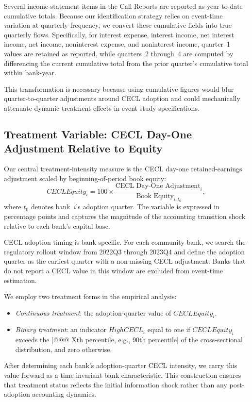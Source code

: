 Several income-statement items in the Call Reports are reported as year-to-date cumulative totals. Because our identification strategy relies on event-time variation at quarterly frequency, we convert these cumulative fields into true quarterly flows. Specifically, for interest expense, interest income, net interest income, net income, noninterest expense, and noninterest income, quarter~1 values are retained as reported, while quarters~2 through~4 are computed by differencing the current cumulative total from the prior quarter's cumulative total within bank-year.

This transformation is necessary because using cumulative figures would blur quarter-to-quarter adjustments around CECL adoption and could mechanically attenuate dynamic treatment effects in event-study specifications.

\subsection{Treatment Variable: CECL Day-One Adjustment Relative to Equity}

Our central treatment-intensity measure is the CECL day-one retained-earnings adjustment scaled by beginning-of-period book equity:
\[
CECLEquity_{i} = 100 \times \frac{\text{CECL Day-One Adjustment}_{i}}{\text{Book Equity}_{i,t_0}},
\]
where $t_0$ denotes bank~$i$'s adoption quarter. The variable is expressed in percentage points and captures the magnitude of the accounting transition shock relative to each bank's capital base.

CECL adoption timing is bank-specific. For each community bank, we search the regulatory rollout window from 2022Q3 through 2023Q4 and define the adoption quarter as the earliest quarter with a non-missing CECL adjustment. Banks that do not report a CECL value in this window are excluded from event-time estimation.

We employ two treatment forms in the empirical analysis:
\begin{itemize}
\item \emph{Continuous treatment}: the adoption-quarter value of $CECLEquity_i$.
\item \emph{Binary treatment}: an indicator $HighCECL_i$ equal to one if $CECLEquity_i$ exceeds the [@@@ Xth percentile, e.g., 90th percentile] of the cross-sectional distribution, and zero otherwise.
\end{itemize}
After determining each bank's adoption-quarter CECL intensity, we carry this value forward as a time-invariant bank characteristic. This construction ensures that treatment status reflects the initial information shock rather than any post-adoption accounting dynamics.

